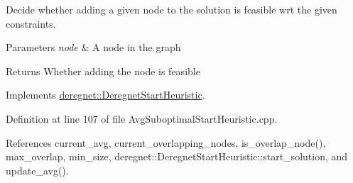 Decide whether adding a given node to the solution is feasible wrt the given constraints. 


\begin{DoxyParams}{Parameters}
{\em node} & A node in the graph\\
\hline
\end{DoxyParams}
\begin{DoxyReturn}{Returns}
Whether adding the node is feasible 
\end{DoxyReturn}


Implements \hyperlink{classderegnet_1_1DeregnetStartHeuristic_ac296c4f122f7d3ad2fcc2cbb0d1b5379}{deregnet\+::\+Deregnet\+Start\+Heuristic}.



Definition at line 107 of file Avg\+Suboptimal\+Start\+Heuristic.\+cpp.



References current\+\_\+avg, current\+\_\+overlapping\+\_\+nodes, is\+\_\+overlap\+\_\+node(), max\+\_\+overlap, min\+\_\+size, deregnet\+::\+Deregnet\+Start\+Heuristic\+::start\+\_\+solution, and update\+\_\+avg().


